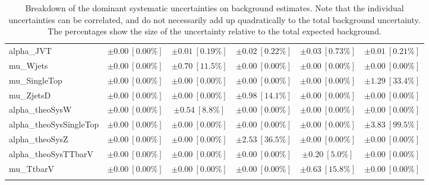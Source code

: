 \begin{sidewaystable}
\begin{center}
\begin{tabular*}{\textwidth}{@{\extracolsep{\fill}}lccccc}
alpha\_JVT         & $\pm 0.00\ [0.00\%] $          & $\pm 0.01\ [0.19\%] $          & $\pm 0.02\ [0.22\%] $          & $\pm 0.03\ [0.73\%] $          & $\pm 0.01\ [0.21\%] $       \\
mu\_Wjets         & $\pm 0.00\ [0.00\%] $          & $\pm 0.70\ [11.5\%] $          & $\pm 0.00\ [0.00\%] $          & $\pm 0.00\ [0.00\%] $          & $\pm 0.00\ [0.00\%] $       \\
mu\_SingleTop         & $\pm 0.00\ [0.00\%] $          & $\pm 0.00\ [0.00\%] $          & $\pm 0.00\ [0.00\%] $          & $\pm 0.00\ [0.00\%] $          & $\pm 1.29\ [33.4\%] $       \\
mu\_ZjetsD         & $\pm 0.00\ [0.00\%] $          & $\pm 0.00\ [0.00\%] $          & $\pm 0.98\ [14.1\%] $          & $\pm 0.00\ [0.00\%] $          & $\pm 0.00\ [0.00\%] $       \\
alpha\_theoSysW         & $\pm 0.00\ [0.00\%] $          & $\pm 0.54\ [8.8\%] $          & $\pm 0.00\ [0.00\%] $          & $\pm 0.00\ [0.00\%] $          & $\pm 0.00\ [0.00\%] $       \\
alpha\_theoSysSingleTop         & $\pm 0.00\ [0.00\%] $          & $\pm 0.00\ [0.00\%] $          & $\pm 0.00\ [0.00\%] $          & $\pm 0.00\ [0.00\%] $          & $\pm 3.83\ [99.5\%] $       \\
alpha\_theoSysZ         & $\pm 0.00\ [0.00\%] $          & $\pm 0.00\ [0.00\%] $          & $\pm 2.53\ [36.5\%] $          & $\pm 0.00\ [0.00\%] $          & $\pm 0.00\ [0.00\%] $       \\
alpha\_theoSysTTbarV         & $\pm 0.00\ [0.00\%] $          & $\pm 0.00\ [0.00\%] $          & $\pm 0.00\ [0.00\%] $          & $\pm 0.20\ [5.0\%] $          & $\pm 0.00\ [0.00\%] $       \\
mu\_TtbarV         & $\pm 0.00\ [0.00\%] $          & $\pm 0.00\ [0.00\%] $          & $\pm 0.00\ [0.00\%] $          & $\pm 0.63\ [15.8\%] $          & $\pm 0.00\ [0.00\%] $       \\
\noalign{\smallskip}\hline\noalign{\smallskip}
\end{tabular*}
\end{center}
\caption[Breakdown of uncertainty on background estimates]{
Breakdown of the dominant systematic uncertainties on background estimates.
Note that the individual uncertainties can be correlated, and do not necessarily add up quadratically to 
the total background uncertainty. The percentages show the size of the uncertainty relative to the total expected background.
\label{table.results.bkgestimate.uncertainties.SRD_low_bybkg}}
\end{sidewaystable}
%